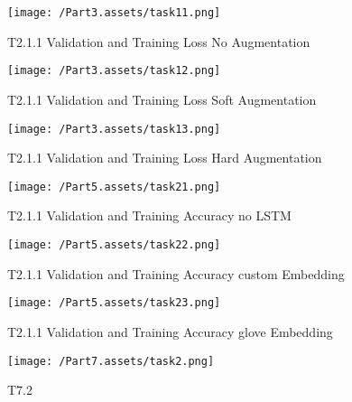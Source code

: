 \documentclass[10pt,twocolumn,letterpaper]{article}
\begin{document}
\begin{figure}[ht]
    \begin{center}
        \texttt{[image: /Part3.assets/task11.png]}
        \caption{T2.1.1 Validation and Training Loss No Augmentation}\label{fig:t311}
    \end{center}
\end{figure}
\begin{figure}[ht]
    \begin{center}
        \texttt{[image: /Part3.assets/task12.png]}
        \caption{T2.1.1 Validation and Training Loss Soft Augmentation}\label{fig:t312}
    \end{center}
\end{figure}
\begin{figure}[ht]
    \begin{center}
        \texttt{[image: /Part3.assets/task13.png]}
        \caption{T2.1.1 Validation and Training Loss Hard Augmentation}\label{fig:t313}
    \end{center}
\end{figure}

\begin{figure}[ht]
    \begin{center}
        \texttt{[image: /Part5.assets/task21.png]}
        \caption{T2.1.1 Validation and Training Accuracy no LSTM}\label{fig:t521}
    \end{center}
\end{figure}
\begin{figure}[ht]
    \begin{center}
        \texttt{[image: /Part5.assets/task22.png]}
        \caption{T2.1.1 Validation and Training Accuracy custom Embedding}\label{fig:t522}
    \end{center}
\end{figure}
\begin{figure}[ht]
    \begin{center}
        \texttt{[image: /Part5.assets/task23.png]}
        \caption{T2.1.1 Validation and Training Accuracy glove Embedding}\label{fig:t523}
    \end{center}
\end{figure}


\begin{figure}[ht]
    \begin{center}
        \texttt{[image: /Part7.assets/task2.png]}
        \caption{T7.2 }\label{fig:t72}
    \end{center}
\end{figure}
\end{document}
